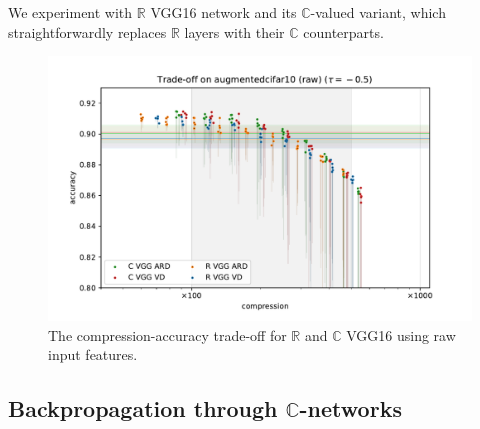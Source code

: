 \documentclass[a4paper,10pt]{article}
\newcommand{\real}{\mathbb{R}}
\newcommand{\cplx}{\mathbb{C}}
\begin{document}
We experiment with $\real$ VGG16 network \citep{simonyan_very_2015} and its $\cplx$-valued
variant, which straightforwardly replaces $\real$ layers with their $\cplx$ counterparts.

\begin{figure}[htb]
  \centering
  \includegraphics[width=\linewidth]{figure__cifar__trade-off/appendix__augmentedcifar10__raw__-0.5.pdf}
  \caption{%
    The compression-accuracy trade-off for $\real$ and $\cplx$ VGG16 using raw input features.
  }
  \label{fig:appendix__cifar__trade-off__VGG16__raw}
\end{figure}


\subsection{Backpropagation through $\cplx$-networks} %
\label{sub:wirtinger_calculus}
\end{document}
